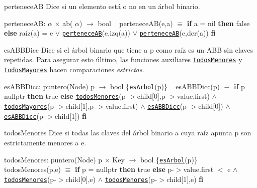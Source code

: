 \begin{DoxyParagraph}{pertenece\+AB}
Dice si un elemento está o no en un árbol binario.

pertenece\+AB\+:  $\alpha$ $\times$ ab( $\alpha$) $\to$ bool ~\newline
pertenece\+A\+B(e,a) $\equiv$ {\bfseries if} a = nil {\bfseries then} false {\bfseries else} raíz(a) = e $\lor$ \href{axiomas.html#perteneceAB}{\tt pertenece\+AB}(e,izq(a)) $\lor$ \href{axiomas.html#perteneceAB}{\tt pertenece\+AB}(e,der(a)) {\bfseries fi} 


\end{DoxyParagraph}
\begin{DoxyParagraph}{es\+A\+B\+B\+Dicc}
Dice si el árbol binario que tiene a p como raíz es un A\+BB sin claves repetidas. Para asegurar esto último, las funciones auxiliares \href{axiomas.html#todosMenores}{\tt todos\+Menores} y \href{axiomas.html#todosMayores}{\tt todos\+Mayores} hacen comparaciones {\itshape estrictas}.

es\+A\+B\+B\+Dicc\+: puntero(\+Node) p $\to$ bool \{\href{axiomas.html#esArbol}{\tt es\+Arbol}(p)\} ~\newline
es\+A\+B\+B\+Dicc(p) $\equiv$ {\bfseries if} p = nullptr {\bfseries then} true {\bfseries else} \href{axiomas.html#todosMenores}{\tt todos\+Menores}(p-\/$>$child\mbox{[}0\mbox{]},p-\/$>$value.\+first) $\land$ \href{axiomas.html#todosMayores}{\tt todos\+Mayores}(p-\/$>$child\mbox{[}1\mbox{]},p-\/$>$value.\+first) $\land$ \href{axiomas.html#esABBDicc}{\tt es\+A\+B\+B\+Dicc}(p-\/$>$child\mbox{[}0\mbox{]}) $\land$ \href{axiomas.html#esABBDicc}{\tt es\+A\+B\+B\+Dicc}(p-\/$>$child\mbox{[}1\mbox{]}) {\bfseries fi} 


\end{DoxyParagraph}
\begin{DoxyParagraph}{todos\+Menores}
Dice si todas las claves del árbol binario a cuya raíz apunta p son estrictamente menores a e.

todos\+Menores\+: puntero(\+Node) p $\times$ Key $\to$ bool \{\href{axiomas.html#esArbol}{\tt es\+Arbol}(p)\} ~\newline
todos\+Menores(p,e) $\equiv$ {\bfseries if} p = nullptr {\bfseries then} true {\bfseries else} p-\/$>$value.\+first $<$ e $\land$ \href{axiomas.html#todosMenores}{\tt todos\+Menores}(p-\/$>$child\mbox{[}0\mbox{]},e) $\land$ \href{axiomas.html#todosMenores}{\tt todos\+Menores}(p-\/$>$child\mbox{[}1\mbox{]},e) {\bfseries fi} 


\end{DoxyParagraph}
